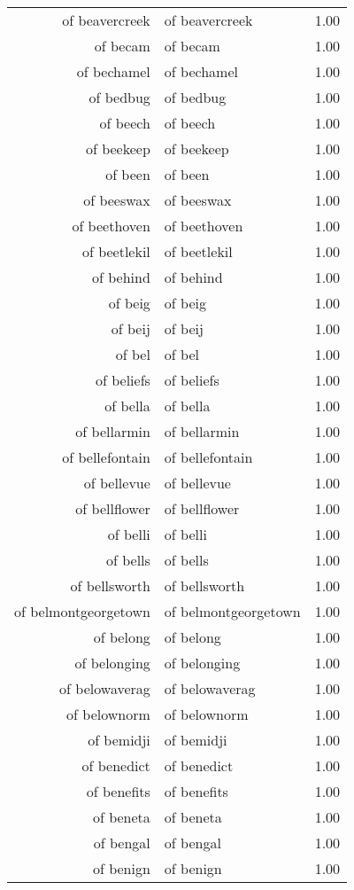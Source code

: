 \begin{table}[ht]
\begin{tabular}{rlr}
  of beavercreek & of beavercreek & 1.00 \\ 
  of becam & of becam & 1.00 \\ 
  of bechamel & of bechamel & 1.00 \\ 
  of bedbug & of bedbug & 1.00 \\ 
  of beech & of beech & 1.00 \\ 
  of beekeep & of beekeep & 1.00 \\ 
  of been & of been & 1.00 \\ 
  of beeswax & of beeswax & 1.00 \\ 
  of beethoven & of beethoven & 1.00 \\ 
  of beetlekil & of beetlekil & 1.00 \\ 
  of behind & of behind & 1.00 \\ 
  of beig & of beig & 1.00 \\ 
  of beij & of beij & 1.00 \\ 
  of bel & of bel & 1.00 \\ 
  of beliefs & of beliefs & 1.00 \\ 
  of bella & of bella & 1.00 \\ 
  of bellarmin & of bellarmin & 1.00 \\ 
  of bellefontain & of bellefontain & 1.00 \\ 
  of bellevue & of bellevue & 1.00 \\ 
  of bellflower & of bellflower & 1.00 \\ 
  of belli & of belli & 1.00 \\ 
  of bells & of bells & 1.00 \\ 
  of bellsworth & of bellsworth & 1.00 \\ 
  of belmontgeorgetown & of belmontgeorgetown & 1.00 \\ 
  of belong & of belong & 1.00 \\ 
  of belonging & of belonging & 1.00 \\ 
  of belowaverag & of belowaverag & 1.00 \\ 
  of belownorm & of belownorm & 1.00 \\ 
  of bemidji & of bemidji & 1.00 \\ 
  of benedict & of benedict & 1.00 \\ 
  of benefits & of benefits & 1.00 \\ 
  of beneta & of beneta & 1.00 \\ 
  of bengal & of bengal & 1.00 \\ 
  of benign & of benign & 1.00 \\ 

\end{tabular}
\end{table}
